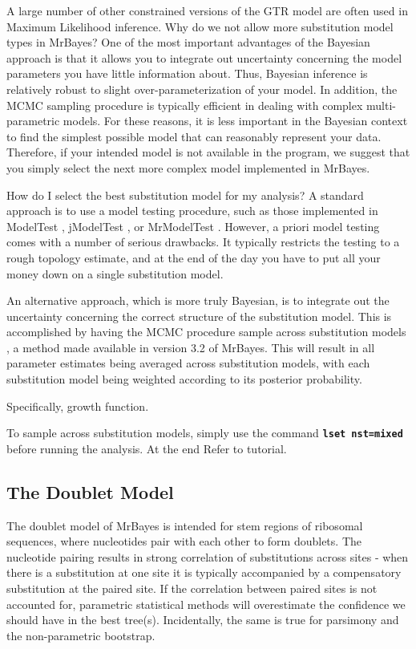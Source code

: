 \documentclass[12pt]{book}
\newcommand{\tb}[1]{\texttt{\textbf{#1}} }
\begin{document}
A large number of other constrained versions of the GTR model are often used in Maximum Likelihood
inference. Why do we not allow more substitution model types in MrBayes?  One of the most important
advantages of the Bayesian approach is that it allows you to integrate out uncertainty concerning
the model parameters you have little information about. Thus, Bayesian inference is relatively
robust to slight over-parameterization of your model. In addition, the MCMC sampling procedure is
typically efficient in dealing with complex multi-parametric models. For these reasons, it is less
important in the Bayesian context to find the simplest possible model that can reasonably represent
your data. Therefore, if your intended model is not available in the program, we suggest that you
simply select the next more complex model implemented in MrBayes.

How do I select the best substitution model for my analysis? A standard approach is to use a model
testing procedure, such as those implemented in ModelTest \citep{posada98}, jModelTest
\citep{posada08}, or MrModelTest \citep{}. However, a priori model testing comes with a number of
serious drawbacks. It typically restricts the testing to a rough topology estimate, and at the end
of the day you have to put all your money down on a single substitution model.

An alternative approach, which is more truly Bayesian, is to integrate out the uncertainty
concerning the correct structure of the substitution model. This is accomplished by having the MCMC
procedure sample across substitution models \citep{huelsenbeck04d}, a method made available in
version 3.2 of MrBayes. This will result in all parameter estimates being averaged across
substitution models, with each substitution model being weighted according to its posterior
probability.

Specifically, growth function.

To sample across substitution models, simply use the command \tb{lset nst=mixed} before running the
analysis. At the end Refer to tutorial.


\subsection{The Doublet Model}
The doublet model of MrBayes is intended for stem regions of ribosomal sequences, where nucleotides
pair with each other to form doublets. The nucleotide pairing results in strong correlation of
substitutions across sites - when there is a substitution at one site it is typically accompanied
by a compensatory substitution at the paired site. If the correlation between paired sites is not
accounted for, parametric statistical methods will overestimate the confidence we should have in
the best tree(s). Incidentally, the same is true for parsimony and the non-parametric bootstrap.
\end{document}
